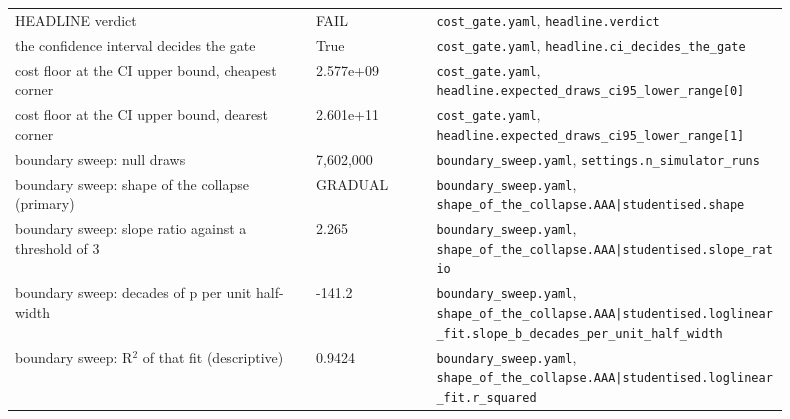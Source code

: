 \begin{longtable}{p{0.35\linewidth} p{0.14\linewidth} p{0.41\linewidth}}
HEADLINE verdict & FAIL & \texttt{\footnotesize cost\_\allowbreak{}gate.\allowbreak{}yaml}, \texttt{\footnotesize headline.\allowbreak{}verdict} \\
the confidence interval decides the gate & True & \texttt{\footnotesize cost\_\allowbreak{}gate.\allowbreak{}yaml}, \texttt{\footnotesize headline.\allowbreak{}ci\_\allowbreak{}decides\_\allowbreak{}the\_\allowbreak{}gate} \\
cost floor at the CI upper bound, cheapest corner & 2.577e+09 & \texttt{\footnotesize cost\_\allowbreak{}gate.\allowbreak{}yaml}, \texttt{\footnotesize headline.\allowbreak{}expected\_\allowbreak{}draws\_\allowbreak{}ci95\_\allowbreak{}lower\_\allowbreak{}range[0]} \\
cost floor at the CI upper bound, dearest corner & 2.601e+11 & \texttt{\footnotesize cost\_\allowbreak{}gate.\allowbreak{}yaml}, \texttt{\footnotesize headline.\allowbreak{}expected\_\allowbreak{}draws\_\allowbreak{}ci95\_\allowbreak{}lower\_\allowbreak{}range[1]} \\
boundary sweep: null draws & 7,602,000 & \texttt{\footnotesize boundary\_\allowbreak{}sweep.\allowbreak{}yaml}, \texttt{\footnotesize settings.\allowbreak{}n\_\allowbreak{}simulator\_\allowbreak{}runs} \\
boundary sweep: shape of the collapse (primary) & GRADUAL & \texttt{\footnotesize boundary\_\allowbreak{}sweep.\allowbreak{}yaml}, \texttt{\footnotesize shape\_\allowbreak{}of\_\allowbreak{}the\_\allowbreak{}collapse.\allowbreak{}AAA|\allowbreak{}studentised.\allowbreak{}shape} \\
boundary sweep: slope ratio against a threshold of 3 & 2.265 & \texttt{\footnotesize boundary\_\allowbreak{}sweep.\allowbreak{}yaml}, \texttt{\footnotesize shape\_\allowbreak{}of\_\allowbreak{}the\_\allowbreak{}collapse.\allowbreak{}AAA|\allowbreak{}studentised.\allowbreak{}slope\_\allowbreak{}ratio} \\
boundary sweep: decades of p per unit half-width & -141.2 & \texttt{\footnotesize boundary\_\allowbreak{}sweep.\allowbreak{}yaml}, \texttt{\footnotesize shape\_\allowbreak{}of\_\allowbreak{}the\_\allowbreak{}collapse.\allowbreak{}AAA|\allowbreak{}studentised.\allowbreak{}loglinear\_\allowbreak{}fit.\allowbreak{}slope\_\allowbreak{}b\_\allowbreak{}decades\_\allowbreak{}per\_\allowbreak{}unit\_\allowbreak{}half\_\allowbreak{}width} \\
boundary sweep: R$^2$ of that fit (descriptive) & 0.9424 & \texttt{\footnotesize boundary\_\allowbreak{}sweep.\allowbreak{}yaml}, \texttt{\footnotesize shape\_\allowbreak{}of\_\allowbreak{}the\_\allowbreak{}collapse.\allowbreak{}AAA|\allowbreak{}studentised.\allowbreak{}loglinear\_\allowbreak{}fit.\allowbreak{}r\_\allowbreak{}squared} \\

\end{longtable}
